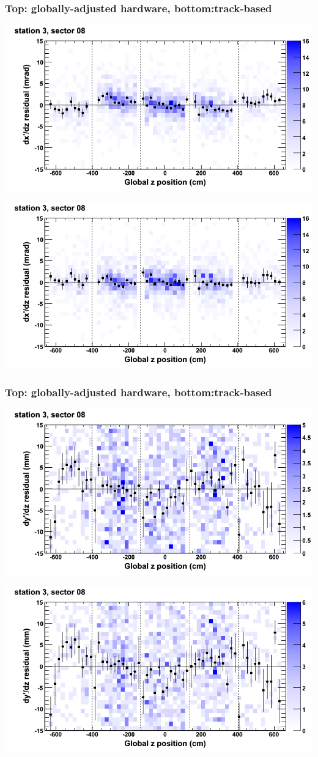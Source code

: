\documentclass[compress]{beamer}
\begin{document}
\begin{frame}
\frametitle{Top: globally-adjusted hardware, bottom:track-based}
\includegraphics[width=0.7\linewidth]{NOV4_mapplots_HW/DTvsz_st3sec08_dxdz.png}

\includegraphics[width=0.7\linewidth]{NOV4_mapplots/DTvsz_st3sec08_dxdz.png}
\end{frame}

\begin{frame}
\frametitle{Top: globally-adjusted hardware, bottom:track-based}
\includegraphics[width=0.7\linewidth]{NOV4_mapplots_HW/DTvsz_st3sec08_dydz.png}

\includegraphics[width=0.7\linewidth]{NOV4_mapplots/DTvsz_st3sec08_dydz.png}
\end{frame}
\end{document}
